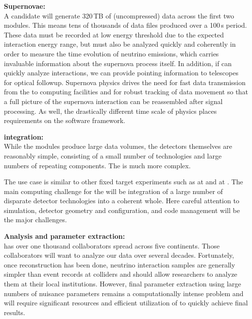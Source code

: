 \documentclass[../main-v1.tex]{subfiles}
\begin{document}
\begin{description}
\item{\bf Supernovae:\\}A %
 candidate will generate 320\,TB of (uncompressed) data across the first two modules. This means tens of thousands of data files produced over a 100\,s period. These data must be recorded at low energy threshold due to the expected interaction energy range, but must also be analyzed quickly and coherently in order to measure the time evolution of neutrino emissions, which carries invaluable information about the supernova process itself. In addition, if  can quickly analyze  interactions, we can provide pointing information to telescopes for optical followup.  %
Supernova physics drives the need for fast data transmission from the  to computing facilities and for robust tracking of data movement so that a full picture of the supernova interaction can be reassembled after signal processing.
As well, the drastically different time scale of  physics places requirements on the software framework. %

\item{\bf {} integration: \\}
While the  %
modules produce large data volumes, the detectors themselves are reasonably simple, consisting of a small number of technologies and large numbers of repeating components.  The  is much more complex. 

The  use case is similar to other fixed target experiments such as  at  and  at .  The main computing challenge for the  will be integration of a large number of disparate detector technologies into a coherent whole. Here careful attention to simulation, detector geometry and configuration, and code management will be the major challenges. 

\item{\bf Analysis and parameter extraction:\\}
 has over one thousand collaborators spread across five continents. Those collaborators will want to analyze our data over several decades. Fortunately, once reconstruction has been done, neutrino interaction samples are generally simpler than event records at colliders and should %
allow researchers to analyze them at their local institutions. However, final parameter extraction  using large numbers of nuisance parameters remains a computationally intense problem and will require significant resources
and efficient utilization of  to quickly achieve final results. 



\end{description}
\end{document}
